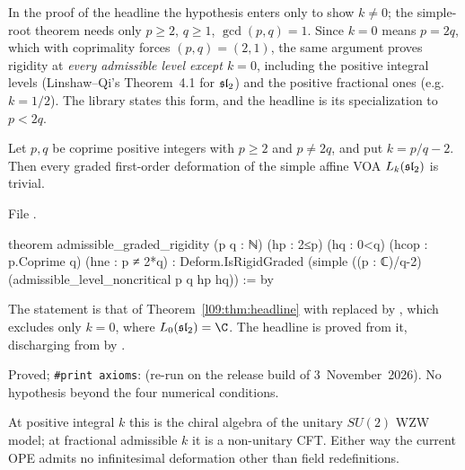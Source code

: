 \begin{sloppypar}In the proof of the headline the hypothesis  enters only to show $k\neq0$; the
simple-root theorem  needs only $p\ge2$, $q\ge1$, $\gcd(p,q)=1$.
Since $k = 0$ means $p = 2q$, which with coprimality forces $(p,q) = (2,1)$, the same argument proves rigidity at
\emph{every admissible level except $k=0$}, including the positive integral levels (Linshaw--Qi's Theorem~4.1 for
$\mathfrak{sl}_2$) and the positive fractional ones (e.g.\ $k = 1/2$). The library states this form, and the headline is
its specialization to $p<2q$.\end{sloppypar}

\begin{theorem}\label{l09:thm:alladmissible}
Let $p,q$ be coprime positive integers with $p\ge2$ and $p\neq2q$, and put $k=p/q-2$. Then every graded first-order
deformation of the simple affine VOA $L_k(\mathfrak{sl}_2)$ is trivial.
\end{theorem}

\noindent File .
\begin{leancode}
theorem admissible_graded_rigidity (p q : ℕ) (hp : 2≤p) (hq : 0<q)
    (hcop : p.Coprime q) (hne : p ≠ 2*q) :
    Deform.IsRigidGraded (simple ((p : ℂ)/q-2) (admissible_level_noncritical p q hp hq)) := by
\end{leancode}

\begin{dictionary}
The statement is that of Theorem~\ref{l09:thm:headline} with  replaced by ,
which excludes only $k=0$, where $L_0(\lninesl)=\C$. The headline
 is proved from it, discharging  from  by .
\end{dictionary}

\begin{status}
Proved; \texttt{\#print axioms}:  (re-run on the release build of
3~November~2026). No hypothesis beyond the four numerical conditions.
\end{status}

\begin{physics}
At positive integral $k$ this is the chiral algebra of the unitary $SU(2)$ WZW model; at fractional admissible $k$ it is
a non-unitary CFT. Either way the current OPE admits no infinitesimal deformation other than field redefinitions.
\end{physics}

